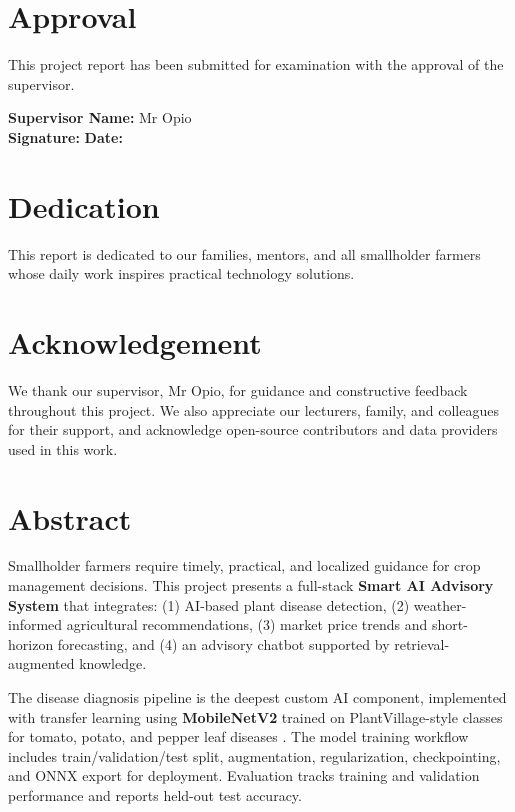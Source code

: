 \documentclass[12pt,a4paper]{report}
\begin{document}
\chapter*{Approval}
This project report has been submitted for examination with the approval of the supervisor.

\vspace{1.2cm}
\noindent\textbf{Supervisor Name:} Mr Opio\\[0.3cm]
\textbf{Signature:} \hrulefill \hspace{1cm} \textbf{Date:} \hrulefill

\chapter*{Dedication}
This report is dedicated to our families, mentors, and all smallholder farmers whose daily work inspires practical technology solutions.

\chapter*{Acknowledgement}
We thank our supervisor, Mr Opio, for guidance and constructive feedback throughout this project. We also appreciate our lecturers, family, and colleagues for their support, and acknowledge open-source contributors and data providers used in this work.

\chapter*{Abstract}
Smallholder farmers require timely, practical, and localized guidance for crop management decisions. This project presents a full-stack \textbf{Smart AI Advisory System} that integrates: (1) AI-based plant disease detection, (2) weather-informed agricultural recommendations, (3) market price trends and short-horizon forecasting, and (4) an advisory chatbot supported by retrieval-augmented knowledge.

The disease diagnosis pipeline is the deepest custom AI component, implemented with transfer learning using \textbf{MobileNetV2} \cite{mobilenetv2} trained on PlantVillage-style classes for tomato, potato, and pepper leaf diseases \cite{plantvillage}. The model training workflow includes train/validation/test split, augmentation, regularization, checkpointing, and ONNX export \cite{onnx} for deployment. Evaluation tracks training and validation performance and reports held-out test accuracy.
\end{document}
